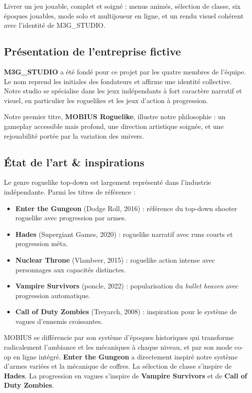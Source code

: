 \documentclass[12pt,a4paper]{article}
\begin{document}
Livrer un jeu jouable, complet et soigné : menus animés, sélection de classe, six époques jouables, mode solo et multijoueur en ligne, et un rendu visuel cohérent avec l'identité de M3G\_STUDIO.

\subsection{Présentation de l'entreprise fictive}

\textbf{M3G\_STUDIO} a été fondé pour ce projet par les quatre membres de l'équipe. Le nom reprend les initiales des fondateurs et affirme une identité collective. Notre studio se spécialise dans les jeux indépendants à fort caractère narratif et visuel, en particulier les roguelikes et les jeux d'action à progression.

Notre premier titre, \textbf{MOBIUS Roguelike}, illustre notre philosophie : un gameplay accessible mais profond, une direction artistique soignée, et une rejouabilité portée par la variation des univers.

\subsection{État de l'art \& inspirations}

Le genre roguelike top-down est largement représenté dans l'industrie indépendante. Parmi les titres de référence :

\begin{itemize}[noitemsep, leftmargin=1.5em]
  \item \textbf{Enter the Gungeon} (Dodge Roll, 2016) : référence du top-down shooter roguelike avec progression par armes.
  \item \textbf{Hades} (Supergiant Games, 2020) : roguelike narratif avec runs courts et progression méta.
  \item \textbf{Nuclear Throne} (Vlambeer, 2015) : roguelike action intense avec personnages aux capacités distinctes.
  \item \textbf{Vampire Survivors} (poncle, 2022) : popularisation du \textit{bullet heaven} avec progression automatique.
  \item \textbf{Call of Duty Zombies} (Treyarch, 2008) : inspiration pour le système de vagues d'ennemis croissantes.
\end{itemize}

MOBIUS se différencie par son système d'époques historiques qui transforme radicalement l'ambiance et les mécaniques à chaque niveau, et par son mode co-op en ligne intégré. \textbf{Enter the Gungeon} a directement inspiré notre système d'armes variées et la mécanique de coffres. La sélection de classe s'inspire de \textbf{Hades}. La progression en vagues s'inspire de \textbf{Vampire Survivors} et de \textbf{Call of Duty Zombies}.
\end{document}
